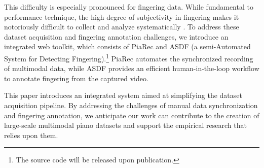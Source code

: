 \documentclass{article}
\begin{document}
This difficulty is especially pronounced for fingering data. While fundamental to performance technique, the high degree of subjectivity in fingering makes it notoriously difficult to collect and analyze systematically \cite{swinkin2007keyboard}. To address these dataset acquisition and fingering annotation challenges, we introduce an integrated web toolkit, which consists of PiaRec and ASDF (a semi-Automated System for Detecting Fingering).\footnote{The source code will be released upon publication.} PiaRec automates the synchronized recording of multimodal data, while ASDF provides an efficient human-in-the-loop workflow to annotate fingering from the captured video.

This paper introduces an integrated system aimed at simplifying the dataset acquisition pipeline. By addressing the challenges of manual data synchronization and fingering annotation, we anticipate our work can contribute to the creation of large-scale multimodal piano datasets and support the empirical research that relies upon them.



\end{document}
